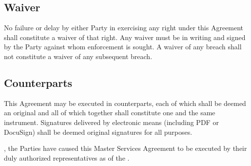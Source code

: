 \subsection{Waiver}
No failure or delay by either Party in exercising any right under this Agreement shall constitute a waiver of that right. Any waiver must be in writing and signed by the Party against whom enforcement is sought. A waiver of any breach shall not constitute a waiver of any subsequent breach.

\subsection{Counterparts}
This Agreement may be executed in counterparts, each of which shall be deemed an original and all of which together shall constitute one and the same instrument. Signatures delivered by electronic means (including PDF or DocuSign) shall be deemed original signatures for all purposes.

\vspace{1em}
, the Parties have caused this Master Services Agreement to be executed by their duly authorized representatives as of the .

